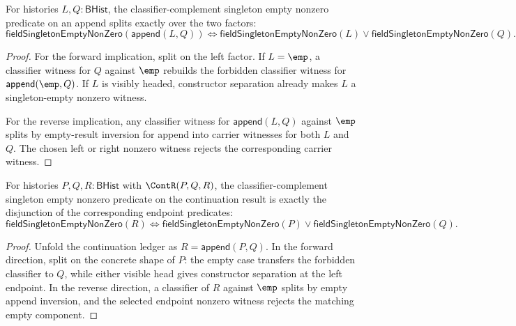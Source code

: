 \begin{theorem}
\label{thm:singleton-empty-nonzero-append-split}
For histories $L,Q:\mathsf{BHist}$, the classifier-complement singleton empty
nonzero predicate on an append splits exactly over the two factors:
$$
\mathsf{fieldSingletonEmptyNonZero}(\mathsf{append}(L,Q))
\Longleftrightarrow
\mathsf{fieldSingletonEmptyNonZero}(L)\lor
\mathsf{fieldSingletonEmptyNonZero}(Q).
$$
\end{theorem}
\begin{proof}
For the forward implication, split on the left factor. If $L=\emp$, a
classifier witness for $Q$ against $\emp$ rebuilds the forbidden classifier
witness for $\mathsf{append}(\emp,Q)$. If $L$ is visibly headed, constructor
separation already makes $L$ a singleton-empty nonzero witness.

For the reverse implication, any classifier witness for
\(\mathsf{append}(L,Q)\) against \(\emp\) splits by empty-result inversion for
append into carrier witnesses for both $L$ and $Q$. The chosen left or right
nonzero witness rejects the corresponding carrier witness.
\end{proof}

\begin{theorem}
\label{thm:field-singleton-empty-nonzero-continuation-endpoint-split}
For histories $P,Q,R:\mathsf{BHist}$ with $\ContR(P,Q,R)$, the
classifier-complement singleton empty nonzero predicate on the continuation
result is exactly the disjunction of the corresponding endpoint predicates:
$$
\mathsf{fieldSingletonEmptyNonZero}(R)
\Longleftrightarrow
\mathsf{fieldSingletonEmptyNonZero}(P)\lor
\mathsf{fieldSingletonEmptyNonZero}(Q).
$$
\end{theorem}
\begin{proof}
Unfold the continuation ledger as $R=\mathsf{append}(P,Q)$. In the forward
direction, split on the concrete shape of $P$: the empty case transfers the
forbidden classifier to $Q$, while either visible head gives constructor
separation at the left endpoint. In the reverse direction, a classifier of
$R$ against $\emp$ splits by empty append inversion, and the selected endpoint
nonzero witness rejects the matching empty component.
\end{proof}

